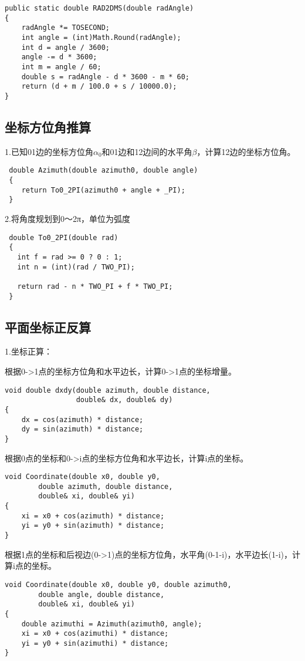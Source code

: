 \begin{verbatim}
public static double RAD2DMS(double radAngle)
{
    radAngle *= TOSECOND;
    int angle = (int)Math.Round(radAngle); 
    int d = angle / 3600;
    angle -= d * 3600;
    int m = angle / 60;
    double s = radAngle - d * 3600 - m * 60;
    return (d + m / 100.0 + s / 10000.0);
}
\end{verbatim}

\subsection{坐标方位角推算}

 1.已知01边的坐标方位角$\alpha_0$和01边和12边间的水平角$\beta$，计算12边的坐标方位角。
 \begin{verbatim}
 double Azimuth(double azimuth0, double angle)
 {
    return To0_2PI(azimuth0 + angle + _PI);
 }
\end{verbatim}

 2.将角度规划到0～2π，单位为弧度
 \begin{verbatim}
 double To0_2PI(double rad)
 {
   int f = rad >= 0 ? 0 : 1;
   int n = (int)(rad / TWO_PI);

   return rad - n * TWO_PI + f * TWO_PI;
 }
 \end{verbatim}

\subsection{平面坐标正反算}
1.坐标正算：

根据0->1点的坐标方位角和水平边长，计算0->1点的坐标增量。
\begin{verbatim}
void double dxdy(double azimuth, double distance,
                 double& dx, double& dy)
{
    dx = cos(azimuth) * distance;
    dy = sin(azimuth) * distance;
}
\end{verbatim}

根据0点的坐标和0->i点的坐标方位角和水平边长，计算i点的坐标。
\begin{verbatim}
void Coordinate(double x0, double y0,
        double azimuth, double distance,
        double& xi, double& yi)
{
    xi = x0 + cos(azimuth) * distance;
    yi = y0 + sin(azimuth) * distance;
}
\end{verbatim}

根据1点的坐标和后视边(0->1)点的坐标方位角，水平角(0-1-i)，水平边长(1-i)，计算i点的坐标。
\begin{verbatim}
void Coordinate(double x0, double y0, double azimuth0,
        double angle, double distance,
        double& xi, double& yi)
{
    double azimuthi = Azimuth(azimuth0, angle);
    xi = x0 + cos(azimuthi) * distance;
    yi = y0 + sin(azimuthi) * distance;
}
\end{verbatim}

